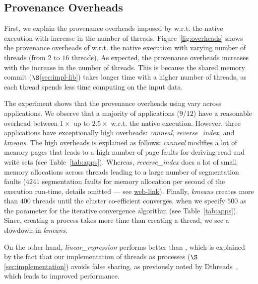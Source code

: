 


\subsection{Provenance Overheads}
\label{subsec:overheads}
First, we explain the provenance overheads imposed by \projecttitle w.r.t. the native \pthreads execution with increase in the number of threads. Figure~\ref{fig:overheads} shows the provenance overheads of \projecttitle w.r.t. the native \pthreads execution with varying number of
threads (from $2$ to $16$ threads). As expected, the provenance overheads increases with the increase in the number of threads. This is because the shared memory commit ($\S$\ref{sec:impl-lib}) takes longer time with a higher number of threads, as each thread spends less time computing on the input data.  

The experiment shows that the provenance overheads using \projecttitle vary across applications. 
We observe that a majority of applications ($9$/$12$) have a reasonable overhead between $1\times$ up to $2.5\times$ w.r.t. the native execution. However, three applications have exceptionally high overheads:  {\em canneal}, {\em reverse\_index}, and {\em kmeans}. The high overheads is explained as follows: {\em canneal} modifies a lot of memory pages that leads to a high number of page faults for deriving read and write sets (see Table~\ref{tab:apps}). Whereas, {\em reverse\_index} does a lot of small memory allocations across threads leading to a large number of segmentation faults ($4241$ segmentation faults for memory allocation per second of the execution run-time, details omitted --- see  \href{https://mic92.github.io/inspector/index.html\#measurement_table}{web-link}).  Finally, {\em kmeans} creates more than $400$ threads until the cluster co-efficient converges, when we specify $500$ as the parameter for the iterative convergence algorithm (see Table~\ref{tab:apps}). Since, creating a process takes more time than creating a thread, we see a slowdown in {\em kmeans}.


On the other hand, {\em linear\_regression} performs better than \pthreads, which is explained by the fact that our implementation of threads as processes ($\S$\ref{sec:implementation})  avoids false sharing, as previously noted by Dthreads~\cite{dthreads-sosp-2011}, which leads to improved performance.



